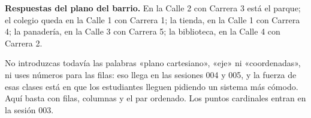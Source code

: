 \documentclass[11pt]{article}
\begin{document}
\textbf{Respuestas del plano del barrio.} En la Calle 2 con Carrera 3 está el parque; el
colegio queda en la Calle 1 con Carrera 1; la tienda, en la Calle 1 con Carrera 4; la
panadería, en la Calle 3 con Carrera 5; la biblioteca, en la Calle 4 con Carrera 2.

\begin{nota}
No introduzcas todavía las palabras «plano cartesiano», «eje» ni «coordenadas», ni uses
números para las filas: eso llega en las sesiones 004 y 005, y la fuerza de esas clases está
en que los estudiantes lleguen pidiendo un sistema más cómodo. Aquí basta con filas, columnas
y el par ordenado. Los puntos cardinales entran en la sesión 003.
\end{nota}
\end{document}
